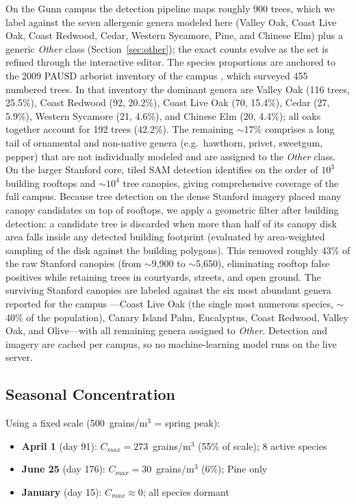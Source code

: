 \documentclass[11pt]{article}
\begin{document}
On the Gunn campus the detection pipeline maps roughly 900 trees, which we label against the seven allergenic genera modeled here (Valley Oak, Coast Live Oak, Coast Redwood, Cedar, Western Sycamore, Pine, and Chinese Elm) plus a generic \emph{Other} class (Section~\ref{sec:other}); the exact counts evolve as the set is refined through the interactive editor. The species proportions are anchored to the 2009 PAUSD arborist inventory of the campus \citep{pausd2009}, which surveyed 455 numbered trees. In that inventory the dominant genera are Valley Oak (116 trees, 25.5\%), Coast Redwood (92, 20.2\%), Coast Live Oak (70, 15.4\%), Cedar (27, 5.9\%), Western Sycamore (21, 4.6\%), and Chinese Elm (20, 4.4\%); all oaks together account for 192 trees (42.2\%). The remaining $\sim$17\% comprises a long tail of ornamental and non-native genera (e.g.\ hawthorn, privet, sweetgum, pepper) that are not individually modeled and are assigned to the \emph{Other} class. On the larger Stanford core, tiled SAM detection identifies on the order of $10^3$ building rooftops and $\sim$$10^4$ tree canopies, giving comprehensive coverage of the full campus. Because tree detection on the dense Stanford imagery placed many canopy candidates on top of rooftops, we apply a geometric filter after building detection: a candidate tree is discarded when more than half of its canopy disk area falls inside any detected building footprint (evaluated by area-weighted sampling of the disk against the building polygons). This removed roughly 43\% of the raw Stanford canopies (from $\sim$9{,}900 to $\sim$5{,}650), eliminating rooftop false positives while retaining trees in courtyards, streets, and open ground. The surviving Stanford canopies are labeled against the six most abundant genera reported for the campus \citep{stanfordtrees, stanfordfacops}---Coast Live Oak (the single most numerous species, $\sim$40\% of the population), Canary Island Palm, Eucalyptus, Coast Redwood, Valley Oak, and Olive---with all remaining genera assigned to \emph{Other}. Detection and imagery are cached per campus, so no machine-learning model runs on the live server.

\subsection{Seasonal Concentration}

Using a fixed scale (500~grains/m$^3$ = spring peak):
\begin{itemize}
    \item \textbf{April 1} (day 91): $C_{max} = 273$~grains/m$^3$ (55\% of scale); 8 active species
    \item \textbf{June 25} (day 176): $C_{max} = 30$~grains/m$^3$ (6\%); Pine only
    \item \textbf{January} (day 15): $C_{max} \approx 0$; all species dormant
\end{itemize}
\end{document}
